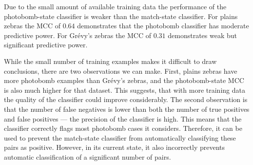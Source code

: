         Due to the small amount of available training data the performance of the photobomb-state classifier is
          weaker than the match-state classifier.
        For plains zebras the MCC of $0.64$ demonstrates that the photobomb classifier has moderate predictive
          power.
        For Grévy's zebras the MCC of $0.31$ demonstrates weak but significant predictive power.

        While the small number of training examples makes it difficult to draw conclusions, there are two
          observations we can make.
        First, plains zebras have more photobomb examples than Grévy's zebras, and the photobomb-state MCC is
          also much higher for that dataset.
        This suggests, that with more training data the quality of the classifier could improve considerably.
        The second observation is that the number of false negatives is lower than both the number of true
          positives and false positives --- \ie{} the precision of the classifier is high.
        This means that the classifier correctly flags most photobomb cases it considers.
        Therefore, it can be used to prevent the match-state classifier from automatically classifying these
          pairs as positive.
        However, in its current state, it also incorrectly prevents automatic classification of a significant
          number of pairs.



        \ConfusionPhotobomb{}

        \EvalMetricsPhotobomb{}


